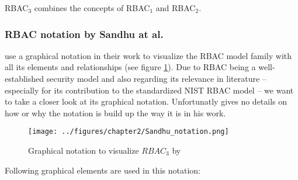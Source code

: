 \documentclass[twoside, openright, 12pt]{book}
\begin{document}
RBAC$_3$ combines the concepts of RBAC$_1$ and RBAC$_2$.





\subsubsection{RBAC notation by Sandhu at al.}
\label{RBAC_notation}
\cite{Sandhu96} use a graphical notation in their work to visualize the RBAC model family with all its elements and relationships (see figure \ref{fig:Sandhu_notation}).
Due to RBAC being a well-established security model and also regarding its relevance in literature -- especially for its contribution to the standardized NIST RBAC model \citep{RBACNIST} -- we want to take a closer look at its graphical notation.
Unfortunatly \cite{Sandhu96} gives no details on how or why the notation is build up the way it is in his work.

\begin{figure}[htb]
	\centering
	\texttt{[image: ../figures/chapter2/Sandhu\_notation.png]}
	\caption{Graphical notation to visualize $RBAC_3$ by \cite{Sandhu96} }
	\label{fig:Sandhu_notation}
\end{figure}

\noindent
Following graphical elements are used in this notation:
\end{document}
